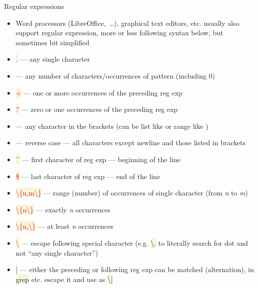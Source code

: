 \documentclass[compress, ucs, xelatex, 11pt, xcolor=svgnames, aspectratio=169,
	hyperref={
		bookmarks=true,
		unicode=true,
		colorlinks=true,
		pdftitle={Linux, command line and MetaCentrum},
		plainpages=false,
		pdfauthor={Vojtech Zeisek},
		pdfsubject={Course about use of Linux command line, writing shell scripts and using MetaCentrum of CESNET},
		pdfcreator={XeLaTeX},
		pdfkeywords={Linux, GNU, BASH, shell, command line, MetaCentrum},
		linkcolor=DarkRed, %
		anchorcolor=DarkBlue, %
		citecolor=Indigo, %
		filecolor=NavyBlue, %
		menucolor=DarkMagenta, %
		urlcolor=DarkBlue, %
		pdftex},
	url={hyphens, lowtilde} %
	]{beamer}
\renewcommand{\texttt}[1]{\colorbox{Beige}{{\ttfamily #1}}}
\renewcommand{\alert}[1]{\textcolor{red}{#1}}
\begin{document}
\begin{frame}[allowframebreaks]{Regular expressions}
\begin{itemize}
		\begin{itemize}
			\item Globbing as well as regular expressions match/expand particular text string (in case of globbing typically file names)
			\item Regular expressions mostly must be quoted (\texttt{'\ldots'}) \textbf{not} to be interpreted by shell, they work mostly with \textbf{text} files (their versatility allows to use them to work with e.g. molecular data)
		\end{itemize}
		\item Word processors (LibreOffice,~\ldots), graphical text editors, etc. usually also support regular expression, more or less following syntax below, but sometimes bit simplified
		\item \alert{\texttt{.}} --- any single character
		\item \alert{\texttt{*}} --- any number of characters/occurrences of pattern (including 0)
		\item \alert{\texttt{+}} --- one or more occurrences of the preceding reg exp
		\item \alert{\texttt{?}} --- zero or one occurrences of the preceding reg exp
		\item \alert{\texttt{[\ldots]}} --- any character in the brackets (can be list like \texttt{[abcd]} or range like \texttt{[a-kxz4-8\_-]})
		\item \alert{\texttt{[\textasciicircum\ldots]}} --- reverse case --- all characters except newline and those listed in brackets
		\item \alert{\texttt{\textasciicircum}} --- first character of reg exp --- beginning of the line
		\item \alert{\texttt{\$}} --- last character of reg exp --- end of the line
		\item \alert{\texttt{\textbackslash\{n,m\textbackslash\}}} --- range (number) of occurrences of single character (from \textit{n} to \textit{m})
		\item \alert{\texttt{\textbackslash\{n\textbackslash\}}} --- exactly \textit{n} occurrences
		\item \alert{\texttt{\textbackslash\{n,\textbackslash\}}} --- at least \textit{n} occurrences
		\item \alert{\texttt{\textbackslash}} --- escape following special character (e.g. \texttt{\textbackslash .} to literally search for dot and not \enquote{any single character})
		\item \alert{\texttt{|}} --- either the preceding or following reg exp can be matched (alternation), in \texttt{grep} etc. escape it and use as \texttt{\textbackslash |}

\end{itemize}
\end{frame}
\end{document}
